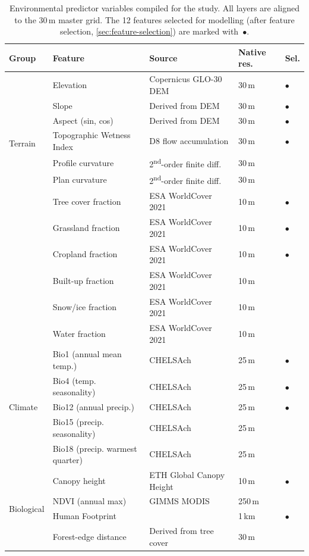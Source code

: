 \begin{table}[htbp]
\centering
\caption{Environmental predictor variables compiled for the study. All layers are aligned to the 30\,m master grid. The 12 features selected for modelling (after feature selection, \cref{sec:feature-selection}) are marked with~$\bullet$.}
\label{tab:features}
\small
\begin{tabularx}{\textwidth}{llXll}
\toprule
\textbf{Group} & \textbf{Feature} & \textbf{Source} & \textbf{Native res.} & \textbf{Sel.} \\
\midrule
\multirow{7}{*}{Terrain}
 & Elevation & Copernicus GLO-30 DEM & 30\,m & $\bullet$ \\
 & Slope & Derived from DEM & 30\,m & $\bullet$ \\
 & Aspect (sin, cos) & Derived from DEM & 30\,m & $\bullet$ \\
 & Topographic Wetness Index & D8 flow accumulation & 30\,m & $\bullet$ \\
 & Profile curvature & 2\textsuperscript{nd}-order finite diff. & 30\,m & \\
 & Plan curvature & 2\textsuperscript{nd}-order finite diff. & 30\,m & \\
\midrule
\multirow{6}{*}{Land cover}
 & Tree cover fraction & ESA WorldCover 2021 & 10\,m & $\bullet$ \\
 & Grassland fraction & ESA WorldCover 2021 & 10\,m & $\bullet$ \\
 & Cropland fraction & ESA WorldCover 2021 & 10\,m & $\bullet$ \\
 & Built-up fraction & ESA WorldCover 2021 & 10\,m & \\
 & Snow/ice fraction & ESA WorldCover 2021 & 10\,m & \\
 & Water fraction & ESA WorldCover 2021 & 10\,m & \\
\midrule
\multirow{5}{*}{Climate}
 & Bio1 (annual mean temp.) & CHELSAch & 25\,m & $\bullet$ \\
 & Bio4 (temp. seasonality) & CHELSAch & 25\,m & $\bullet$ \\
 & Bio12 (annual precip.) & CHELSAch & 25\,m & $\bullet$ \\
 & Bio15 (precip. seasonality) & CHELSAch & 25\,m & \\
 & Bio18 (precip. warmest quarter) & CHELSAch & 25\,m & \\
\midrule
\multirow{4}{*}{Biological}
 & Canopy height & ETH Global Canopy Height & 10\,m & $\bullet$ \\
 & NDVI (annual max) & GIMMS MODIS & 250\,m & \\
 & Human Footprint & \citet{Mu2022} & 1\,km & $\bullet$ \\
 & Forest-edge distance & Derived from tree cover & 30\,m & \\
\bottomrule
\end{tabularx}
\end{table}

